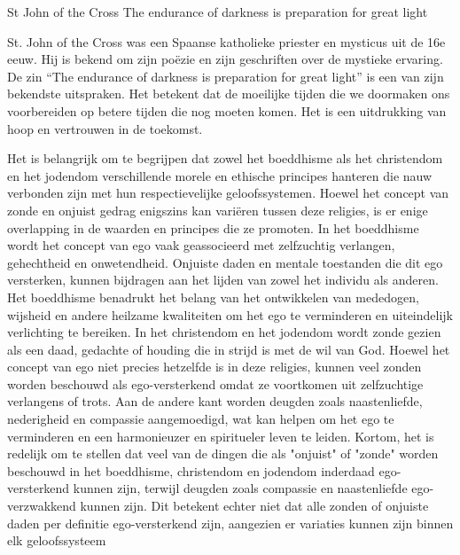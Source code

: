 St John of the Cross
The endurance of darkness is preparation for great light

St. John of the Cross was een Spaanse katholieke priester en mysticus uit de 16e eeuw. Hij is bekend om zijn poëzie en zijn geschriften over de mystieke ervaring. De zin “The endurance of darkness is preparation for great light” is een van zijn bekendste uitspraken. Het betekent dat de moeilijke tijden die we doormaken ons voorbereiden op betere tijden die nog moeten komen. Het is een uitdrukking van hoop en vertrouwen in de toekomst.

Het is belangrijk om te begrijpen dat zowel het boeddhisme als het christendom en het jodendom verschillende morele en ethische principes hanteren die nauw verbonden zijn met hun respectievelijke geloofssystemen. Hoewel het concept van zonde en onjuist gedrag enigszins kan variëren tussen deze religies, is er enige overlapping in de waarden en principes die ze promoten.
In het boeddhisme wordt het concept van ego vaak geassocieerd met zelfzuchtig verlangen, gehechtheid en onwetendheid. Onjuiste daden en mentale toestanden die dit ego versterken, kunnen bijdragen aan het lijden van zowel het individu als anderen. Het boeddhisme benadrukt het belang van het ontwikkelen van mededogen, wijsheid en andere heilzame kwaliteiten om het ego te verminderen en uiteindelijk verlichting te bereiken.
In het christendom en het jodendom wordt zonde gezien als een daad, gedachte of houding die in strijd is met de wil van God. Hoewel het concept van ego niet precies hetzelfde is in deze religies, kunnen veel zonden worden beschouwd als ego-versterkend omdat ze voortkomen uit zelfzuchtige verlangens of trots. Aan de andere kant worden deugden zoals naastenliefde, nederigheid en compassie aangemoedigd, wat kan helpen om het ego te verminderen en een harmonieuzer en spiritueler leven te leiden.
Kortom, het is redelijk om te stellen dat veel van de dingen die als "onjuist" of "zonde" worden beschouwd in het boeddhisme, christendom en jodendom inderdaad ego-versterkend kunnen zijn, terwijl deugden zoals compassie en naastenliefde ego-verzwakkend kunnen zijn. Dit betekent echter niet dat alle zonden of onjuiste daden per definitie ego-versterkend zijn, aangezien er variaties kunnen zijn binnen elk geloofssysteem

